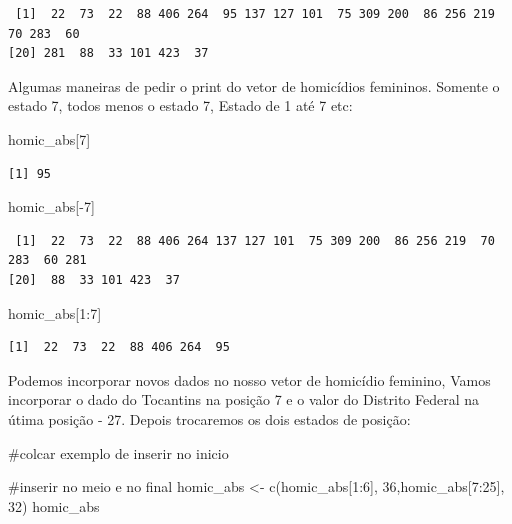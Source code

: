 \documentclass[
  letterpaper,
  DIV=11,
  numbers=noendperiod]{scrreprt}
\newenvironment{Shaded}{\begin{snugshade}}{\end{snugshade}}
\newcommand{\CommentTok}[1]{\textcolor[rgb]{0.37,0.37,0.37}{#1}}
\newcommand{\DecValTok}[1]{\textcolor[rgb]{0.68,0.00,0.00}{#1}}
\newcommand{\FunctionTok}[1]{\textcolor[rgb]{0.28,0.35,0.67}{#1}}
\newcommand{\NormalTok}[1]{\textcolor[rgb]{0.00,0.23,0.31}{#1}}
\newcommand{\OtherTok}[1]{\textcolor[rgb]{0.00,0.23,0.31}{#1}}
\newcommand{\SpecialCharTok}[1]{\textcolor[rgb]{0.37,0.37,0.37}{#1}}
\begin{document}
\begin{verbatim}
 [1]  22  73  22  88 406 264  95 137 127 101  75 309 200  86 256 219  70 283  60
[20] 281  88  33 101 423  37
\end{verbatim}

Algumas maneiras de pedir o print do vetor de homicídios femininos.
Somente o estado 7, todos menos o estado 7, Estado de 1 até 7 etc:

\begin{Shaded}
\begin{Highlighting}[]
\NormalTok{homic\_abs[}\DecValTok{7}\NormalTok{] }
\end{Highlighting}
\end{Shaded}

\begin{verbatim}
[1] 95
\end{verbatim}

\begin{Shaded}
\begin{Highlighting}[]
\NormalTok{homic\_abs[}\SpecialCharTok{{-}}\DecValTok{7}\NormalTok{] }
\end{Highlighting}
\end{Shaded}

\begin{verbatim}
 [1]  22  73  22  88 406 264 137 127 101  75 309 200  86 256 219  70 283  60 281
[20]  88  33 101 423  37
\end{verbatim}

\begin{Shaded}
\begin{Highlighting}[]
\NormalTok{homic\_abs[}\DecValTok{1}\SpecialCharTok{:}\DecValTok{7}\NormalTok{]}
\end{Highlighting}
\end{Shaded}

\begin{verbatim}
[1]  22  73  22  88 406 264  95
\end{verbatim}

Podemos incorporar novos dados no nosso vetor de homicídio feminino,
Vamos incorporar o dado do Tocantins na posição 7 e o valor do Distrito
Federal na útima posição - 27. Depois trocaremos os dois estados de
posição:

\begin{Shaded}
\begin{Highlighting}[]
\CommentTok{\#colcar exemplo de inserir no inicio}

\CommentTok{\#inserir no meio e no final }
\NormalTok{homic\_abs }\OtherTok{\textless{}{-}} \FunctionTok{c}\NormalTok{(homic\_abs[}\DecValTok{1}\SpecialCharTok{:}\DecValTok{6}\NormalTok{], }\DecValTok{36}\NormalTok{,homic\_abs[}\DecValTok{7}\SpecialCharTok{:}\DecValTok{25}\NormalTok{], }\DecValTok{32}\NormalTok{)}
\NormalTok{homic\_abs}
\end{Highlighting}
\end{Shaded}
\end{document}
